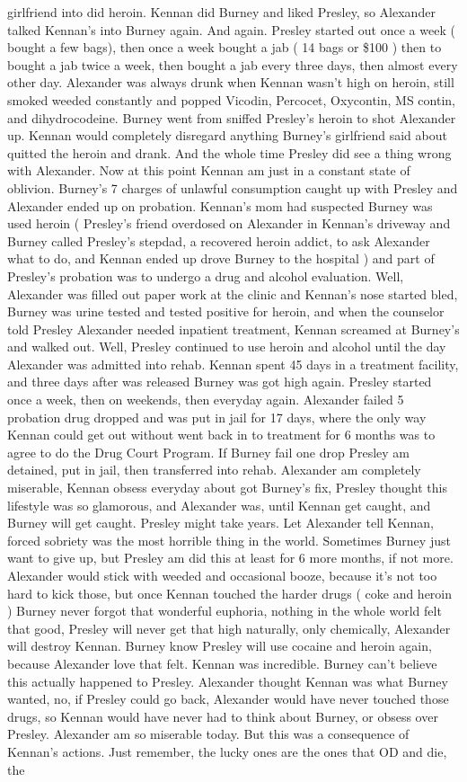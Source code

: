 \documentclass[12pt]{book}
\begin{document}
girlfriend into did heroin. Kennan did Burney and liked Presley, so Alexander talked Kennan's into Burney again. And again. Presley started out once a week ( bought a few bags), then once a week bought a jab ( 14 bags or \$100 ) then to bought a jab twice a week, then bought a jab every three days, then almost every other day. Alexander was always drunk when Kennan wasn't high on heroin, still smoked weeded constantly and popped Vicodin, Percocet, Oxycontin, MS contin, and dihydrocodeine. Burney went from sniffed Presley's heroin to shot Alexander up. Kennan would completely disregard anything Burney's girlfriend said about quitted the heroin and drank. And the whole time Presley did see a thing wrong with Alexander. Now at this point Kennan am just in a constant state of oblivion. Burney's 7 charges of unlawful consumption caught up with Presley and Alexander ended up on probation. Kennan's mom had suspected Burney was used heroin ( Presley's friend overdosed on Alexander in Kennan's driveway and Burney called Presley's stepdad, a recovered heroin addict, to ask Alexander what to do, and Kennan ended up drove Burney to the hospital ) and part of Presley's probation was to undergo a drug and alcohol evaluation. Well, Alexander was filled out paper work at the clinic and Kennan's nose started bled, Burney was urine tested and tested positive for heroin, and when the counselor told Presley Alexander needed inpatient treatment, Kennan screamed at Burney's and walked out. Well, Presley continued to use heroin and alcohol until the day Alexander was admitted into rehab. Kennan spent 45 days in a treatment facility, and three days after was released Burney was got high again. Presley started once a week, then on weekends, then everyday again. Alexander failed 5 probation drug dropped and was put in jail for 17 days, where the only way Kennan could get out without went back in to treatment for 6 months was to agree to do the Drug Court Program. If Burney fail one drop Presley am detained, put in jail, then transferred into rehab. Alexander am completely miserable, Kennan obsess everyday about got Burney's fix, Presley thought this lifestyle was so glamorous, and Alexander was, until Kennan get caught, and Burney will get caught. Presley might take years. Let Alexander tell Kennan, forced sobriety was the most horrible thing in the world. Sometimes Burney just want to give up, but Presley am did this at least for 6 more months, if not more. Alexander would stick with weeded and occasional booze, because it's not too hard to kick those, but once Kennan touched the harder drugs ( coke and heroin ) Burney never forgot that wonderful euphoria, nothing in the whole world felt that good, Presley will never get that high naturally, only chemically, Alexander will destroy Kennan. Burney know Presley will use cocaine and heroin again, because Alexander love that felt. Kennan was incredible. Burney can't believe this actually happened to Presley. Alexander thought Kennan was what Burney wanted, no, if Presley could go back, Alexander would have never touched those drugs, so Kennan would have never had to think about Burney, or obsess over Presley. Alexander am so miserable today. But this was a consequence of Kennan's actions. Just remember, the lucky ones are the ones that OD and die, the 
\end{document}

